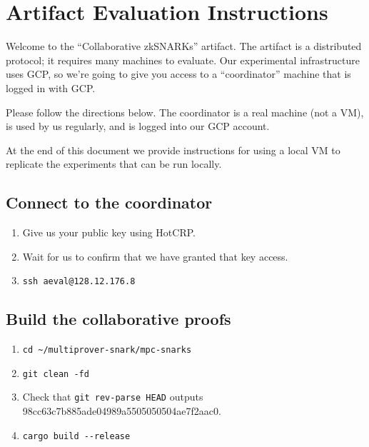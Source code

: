 \hypertarget{artifact-evaluation-instructions}{%
\section{Artifact Evaluation
Instructions}\label{artifact-evaluation-instructions}}

Welcome to the ``Collaborative zkSNARKs'' artifact. The artifact is a
distributed protocol; it requires many machines to evaluate. Our
experimental infrastructure uses GCP, so we're going to give you access
to a ``coordinator'' machine that is logged in with GCP.

Please follow the directions below. The coordinator is a real machine
(not a VM), is used by us regularly, and is logged into our GCP account.

At the end of this document we provide instructions for using a local VM
to replicate the experiments that can be run locally.

\hypertarget{connect-to-the-coordinator}{%
\subsection{Connect to the
coordinator}\label{connect-to-the-coordinator}}

\begin{enumerate}
\def\labelenumi{\arabic{enumi}.}
\tightlist
\item
  Give us your public key using HotCRP.
\item
  Wait for us to confirm that we have granted that key access.
\item
  \texttt{ssh\ aeval@128.12.176.8}
\end{enumerate}

\hypertarget{build-the-collaborative-proofs}{%
\subsection{Build the collaborative
proofs}\label{build-the-collaborative-proofs}}

\begin{enumerate}
\def\labelenumi{\arabic{enumi}.}
\tightlist
\item
  \texttt{cd\ \textasciitilde{}/multiprover-snark/mpc-snarks}
\item
  \texttt{git\ clean\ -fd}
\item
  Check that \texttt{git\ rev-parse\ HEAD} outputs
  98cc63c7b885ade04989a5505050504ae7f2aac0.
\item
  \texttt{cargo\ build\ -\/-release}
\end{enumerate}

